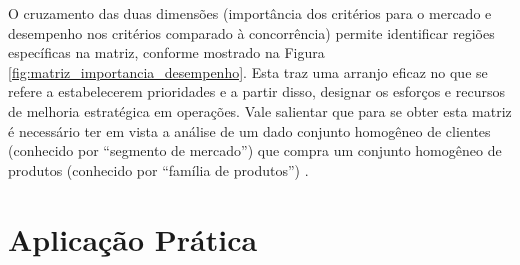 O cruzamento das duas dimensões (importância dos critérios para o mercado e desempenho nos critérios comparado à concorrência) permite identificar regiões específicas na matriz, conforme mostrado na Figura \ref{fig:matriz_importancia_desempenho}. Esta traz uma arranjo eficaz no que se refere a estabelecerem prioridades e a partir disso, designar os esforços e recursos de melhoria estratégica em operações. Vale salientar que para se obter esta matriz é necessário ter em vista a análise de um dado conjunto homogêneo de clientes (conhecido por ``segmento de mercado'') que compra um conjunto homogêneo de produtos (conhecido por ``família de produtos'') \cite{correa2000administracao}.



\section{Aplicação Prática}
\label{sec:estrategia_da_producao_aplicacao}